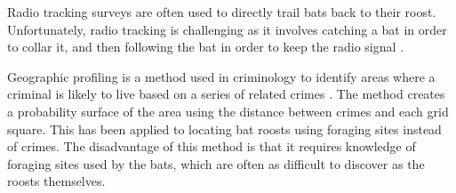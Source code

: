 Radio tracking surveys are often used to directly trail bats back to their
roost. Unfortunately, radio tracking is challenging as it involves catching a
bat in order to collar it, and then following the bat in order to keep the radio
signal \cite{Lewis1995}.

Geographic profiling is a method used in criminology to identify areas where a
criminal is likely to live based on a series of related crimes
\cite{Rossmo1999}. The method creates a probability surface of the area using
the distance between crimes and each grid square. This has been applied to
locating bat roosts \cite{Comber2006} using foraging sites instead of crimes.
The disadvantage of this method is that it requires knowledge of foraging sites
used by the bats, which are often as difficult to discover as the roosts themselves.
